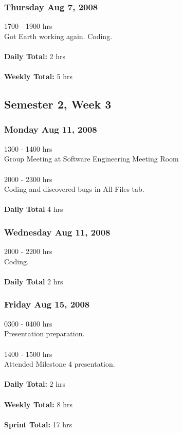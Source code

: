 \documentclass[10pt,a4,oneside]{article}
\begin{document}
\subsubsection*{Thursday Aug 7, 2008}
1700 - 1900 hrs\\
Got Earth working again. Coding.\\
\\
\textbf{Daily Total:} 2 hrs\\
\\
\textbf{Weekly Total:} 5 hrs

\subsection*{Semester 2, Week 3}
\subsubsection*{Monday Aug 11, 2008}
1300 - 1400 hrs\\
Group Meeting at Software Engineering Meeting Room\\
\\
2000 - 2300 hrs\\
Coding and discovered bugs in All Files tab.\\
\\
\textbf{Daily Total} 4 hrs\\

\subsubsection*{Wednesday Aug 11, 2008}
2000 - 2200 hrs\\
Coding.\\
\\
\textbf{Daily Total} 2 hrs\\

\subsubsection*{Friday Aug 15, 2008}
0300 - 0400 hrs\\
Presentation preparation.\\
\\
1400 - 1500 hrs\\
Attended Milestone 4 presentation.\\
\\
\textbf{Daily Total:} 2 hrs\\
\\
\textbf{Weekly Total:} 8 hrs\\
\\
\textbf{Sprint Total:} 17 hrs%
\end{document}
